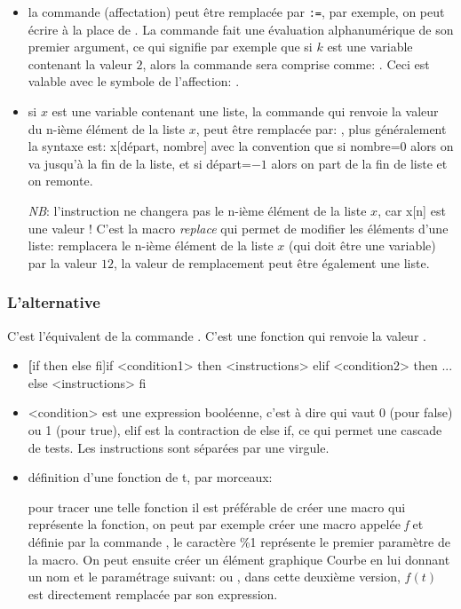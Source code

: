 \begin{itemize}
\item la commande  (affectation) peut être remplacée par \verb|:=|, par exemple, on peut écrire  à la place de . La commande  fait une évaluation alphanumérique de son premier argument, ce qui signifie par exemple que si $k$ est une variable contenant la valeur $2$, alors la commande  sera comprise comme: . Ceci est valable avec le symbole de l'affection: .

\item si $x$ est une variable contenant une liste, la commande  qui renvoie la valeur du n-ième élément de la liste $x$, peut être remplacée par: , plus généralement la syntaxe est: x[départ, nombre] avec la convention que si nombre=$0$ alors on va jusqu'à la fin de la liste, et si départ=$-1$ alors on part de la fin de liste et on remonte.

\textsl{NB}: l'instruction  ne changera pas le n-ième élément de la liste $x$, car x[n] est une valeur !  C'est la macro \textsl{replace} qui permet de modifier les éléments d'une liste:  remplacera le n-ième élément de la liste $x$ (qui doit être une variable) par la valeur $12$, la valeur de remplacement peut être également une liste.
\end{itemize}


\subsubsection{L'alternative}

C'est l'équivalent de la commande . C'est une fonction qui renvoie la valeur \Nil.

\begin{itemize}
\item \util \textbf[if then else fi]{if <condition1> then <instructions> elif <condition2> then ... else <instructions> fi}
\item \desc <condition> est une expression booléenne, c'est à dire qui vaut 0 (pour false) ou 1 (pour true),  elif est la contraction de else if, ce qui permet une cascade de tests. Les instructions sont séparées par une virgule. 
\item \exem définition d'une fonction de t, par morceaux:

\centerline{}

pour tracer une telle fonction il est préférable de créer une macro qui représente la fonction, on peut par exemple créer une macro appelée \textsl{f} et définie par la commande , le caractère \%1 représente le premier paramètre de la macro. On peut ensuite créer un élément graphique Courbe en lui donnant un nom et le paramétrage suivant:  ou , dans cette deuxième version, $f(t)$ est directement remplacée par son expression.
\end{itemize}

